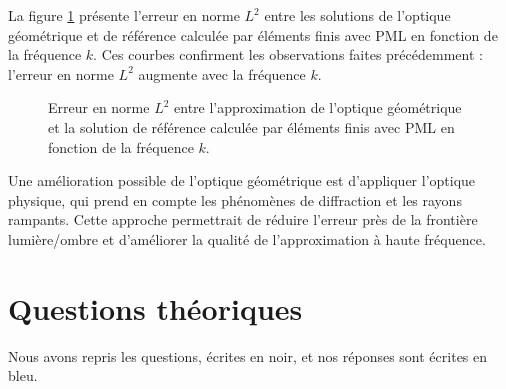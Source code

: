 \documentclass{article}
\begin{document}
La figure \ref{fig:erreur_L2} présente l'erreur en norme $L^2$ entre les solutions de l'optique géométrique et de référence calculée par éléments finis avec PML en fonction de la fréquence $k$. Ces courbes confirment les observations faites précédemment : l'erreur en norme $L^2$ augmente avec la fréquence $k$.

\begin{figure}[H]
    \centering
    
    \caption{Erreur en norme $L^2$ entre l'approximation de l'optique géométrique et la solution de référence calculée par éléments finis avec PML en fonction de la fréquence $k$.}
    \label{fig:erreur_L2}
\end{figure}

Une amélioration possible de l'optique géométrique est d'appliquer l'optique physique, qui prend en compte les phénomènes de diffraction et les rayons rampants. Cette approche permettrait de réduire l'erreur près de la frontière lumière/ombre et d'améliorer la qualité de l'approximation à haute fréquence.

\section{Questions théoriques}

Nous avons repris les questions, écrites en noir, et nos réponses sont écrites en bleu.
\end{document}
